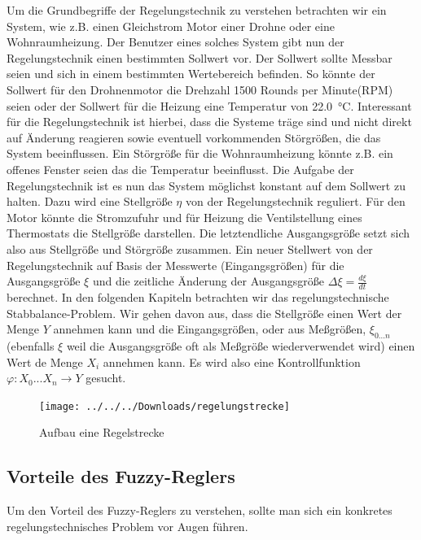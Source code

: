 \documentclass[12pt,a4paper,bibliography=totocnumbered,listof=totocnumbered]{article}
\theoremstyle{Umgebung}
\begin{document}
Um die Grundbegriffe der Regelungstechnik zu verstehen betrachten wir ein System, wie z.B. einen Gleichstrom Motor einer Drohne oder eine Wohnraumheizung. Der Benutzer eines solches System gibt nun der Regelungstechnik einen bestimmten Sollwert vor. Der Sollwert sollte Messbar seien und sich in einem bestimmten Wertebereich befinden. So könnte der Sollwert für den Drohnenmotor die Drehzahl 1500 Rounds per Minute(RPM) seien oder der Sollwert für die Heizung eine Temperatur von \SI{22.0}{\celsius}. Interessant für die Regelungstechnik ist hierbei, dass die Systeme träge sind und nicht direkt auf Änderung reagieren sowie eventuell vorkommenden Störgrößen, die das System beeinflussen. Ein Störgröße für die Wohnraumheizung könnte z.B. ein offenes Fenster seien das die Temperatur beeinflusst. Die Aufgabe der Regelungstechnik ist es nun das System möglichst konstant auf dem Sollwert zu halten. Dazu wird eine Stellgröße $\eta$ von der Regelungstechnik reguliert. Für den Motor könnte die Stromzufuhr und für Heizung die Ventilstellung eines Thermostats die Stellgröße darstellen. Die letztendliche Ausgangsgröße setzt sich also aus Stellgröße und Störgröße zusammen. Ein neuer Stellwert von der Regelungstechnik auf Basis der Messwerte (Eingangsgrößen) für die Ausgangsgröße $\xi$ und die zeitliche Änderung der Ausgangsgröße $\Delta\xi = \frac{d\xi}{dt}$ berechnet. In den folgenden Kapiteln betrachten wir das regelungstechnische Stabbalance-Problem. Wir gehen davon aus, dass die Stellgröße einen Wert der Menge $Y$ annehmen kann  und die Eingangsgrößen, oder aus Meßgrößen, $\xi_{0...n}$ (ebenfalls $\xi$ weil die Ausgangsgröße oft als Meßgröße wiederverwendet wird) einen Wert de Menge $X_i$ annehmen kann. Es wird also eine Kontrollfunktion $\varphi: X_0...X_n \rightarrow Y$ gesucht.

\begin{figure}
	\centering
	\texttt{[image: ../../../Downloads/regelungstrecke]}
	\caption[Aufbau einer Regelstrecke]{Aufbau eine Regelstrecke}
	\label{fig:regelungstrecke}
\end{figure}


\subsection{Vorteile des Fuzzy-Reglers}

Um den Vorteil des Fuzzy-Reglers zu verstehen, sollte man sich ein konkretes regelungstechnisches Problem vor Augen führen.
\end{document}
